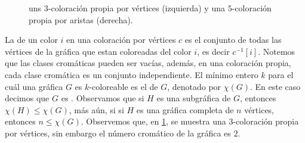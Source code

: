 \begin{figure}[ht!]
    \centering
    \caption{uns $3$-coloraci\'on propia por v\'ertices (izquierda) y una 
        $5$-coloraci\'on propia por aristas (derecha).}
        \label{fig:ex-color-prop}
\end{figure}

La  de un color $i$ en una coloraci\'on por v\'ertices
$c$ es el conjunto de todas las v\'ertices de la gr\'afica que estan coloreadas
del color $i$, es decir $c^{-1}[i]$. Notemos que las clases crom\'aticas pueden
ser vac\'ias, adem\'as, en una coloraci\'on propia, cada clase crom\'atica es un
conjunto independiente. El m\'inimo entero $k$ para el cu\'al una gr\'afica $G$
es $k$-coloreable es el  de $G$, denotado por
$\chi(G)$. En este caso decimos que $G$ es
. Observamos que si $H$ es una
subgr\'afica de $G$, entonces $\chi(H) \leq \chi(G)$, m\'as a\'un, si si $H$ es
una gr\'afica completa de $n$ v\'ertices, entonces $n \leq \chi(G)$. Observemos
que, en \cref{fig:ex-color-prop}, se muestra una $3$-coloraci\'on propia por
v\'ertices, sin embargo el n\'umero crom\'atico de la gr\'afica es $2$.


